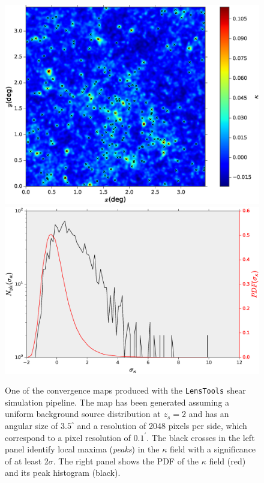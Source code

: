 \documentclass[5p]{elsarticle}
\newcommand{\LT}{\texttt{LensTools} }
\begin{document}
\begin{figure}
\begin{center}
\includegraphics[scale=0.35]{Figures/convergence_visualize.eps}
\includegraphics[scale=0.3]{Figures/convergence_stats.eps}
\caption{One of the convergence maps produced with the \LT shear simulation pipeline. The map has been generated assuming a uniform background source distribution at $z_s=2$ and has an angular size of $3.5^\circ$ and a resolution of 2048 pixels per side, which correspond to a pixel resolution of $0.1^\prime$. The black crosses in the left panel identify local maxima (\textit{peaks}) in the $\kappa$ field with a significance of at least 2$\sigma$. The right panel shows the PDF of the $\kappa$ field (red) and its peak histogram (black).}
\label{convergencefig}
\end{center}
\end{figure}
\end{document}
